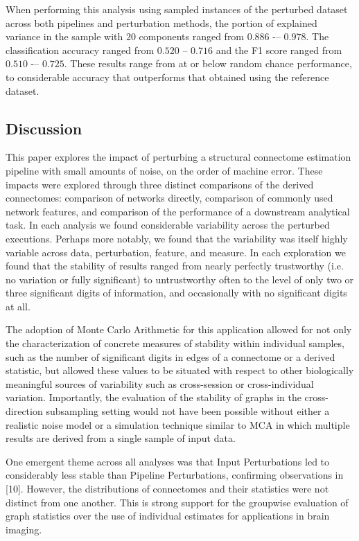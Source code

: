 \documentclass[fleqn,10pt]{SelfArx} %
\begin{document}
When performing this analysis using sampled instances of the perturbed dataset across both pipelines and perturbation
methods, the portion of explained variance in the sample with $20$ components ranged from $0.886$ -– $0.978$. The
classification accuracy ranged from $0.520$ – $0.716$ and the F1 score ranged from $0.510$ -– $0.725$. These results
range from at or below random chance performance, to considerable accuracy that outperforms that obtained using the
reference dataset.

\subsection*{Discussion}

This paper explores the impact of perturbing a structural connectome estimation pipeline with small amounts of noise, on the order of machine error. These impacts were explored through three distinct comparisons of the derived connectomes: comparison of networks directly, comparison of commonly used network features, and comparison of the performance of a downstream analytical task. In each analysis we found considerable variability across the perturbed executions. Perhaps more notably, we found that the variability was itself highly variable across data, perturbation, feature, and measure. In each exploration we found that the stability of results ranged from nearly perfectly trustworthy (i.e. no variation or fully significant) to untrustworthy often to the level of only two or three significant digits of information, and occasionally with no significant digits at all.

The adoption of Monte Carlo Arithmetic for this application allowed for not only the characterization of concrete measures of stability within individual samples, such as the number of significant digits in edges of a connectome or a derived statistic, but allowed these values to be situated with respect to other biologically meaningful sources of variability such as cross-session or cross-individual variation. Importantly, the evaluation of the stability of graphs in the cross-direction subsampling setting would not have been possible without either a realistic noise model or a simulation technique similar to MCA in which multiple results are derived from a single sample of input data.


One emergent theme across all analyses was that Input Perturbations led to considerably less stable than Pipeline Perturbations, confirming observations in [10]. However, the distributions of connectomes and their statistics were not distinct from one another. This is strong support for the groupwise evaluation of graph statistics over the use of individual estimates for applications in brain imaging.
\end{document}
